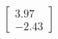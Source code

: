 \documentclass[preview]{standalone}
\begin{document}
\begin{align*}
\begin{bmatrix} 3.97 \\ -2.43 \end{bmatrix}
\end{align*}
\end{document}
